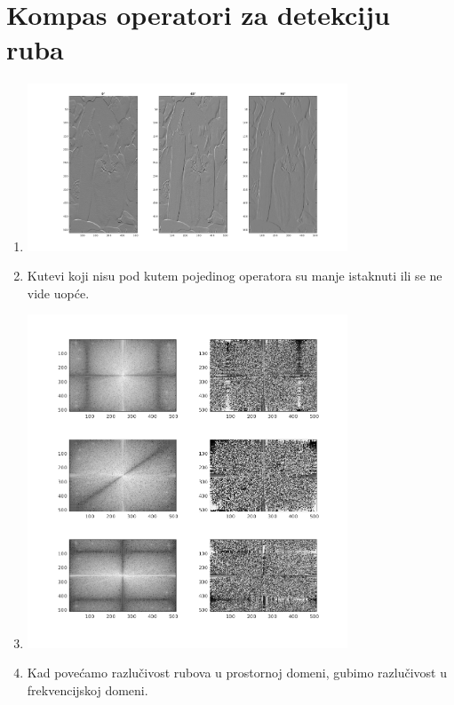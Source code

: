 \documentclass[12pt, a4]{report}
\begin{document}
\section{Kompas operatori za detekciju ruba}
\begin{enumerate}
    \item 
        \begin{minipage}{\linewidth}
            \centering
            \includegraphics[width=0.75\textwidth]{kompas}
        \end{minipage}
    \item
        Kutevi koji nisu pod kutem pojedinog operatora su manje istaknuti ili se ne vide uopće.
    \item
        \begin{minipage}{\linewidth}
            \centering
            \includegraphics[width=0.75\textwidth]{kompasfft}
        \end{minipage}
    \item
        Kad povećamo razlučivost rubova u prostornoj domeni, gubimo razlučivost u frekvencijskoj domeni.
\end{enumerate}
\end{document}
